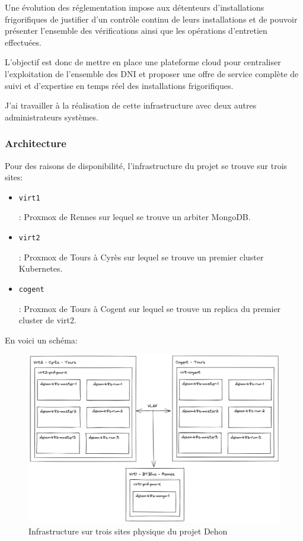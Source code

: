 \documentclass[12pt]{article}
\begin{document}
Une évolution des réglementation impose aux détenteurs d'installations frigorifiques de justifier d'un contrôle continu de leurs installations et de pouvoir présenter l'ensemble des vérifications ainsi que les opérations d'entretien effectuées.

L'objectif est donc de mettre en place une plateforme cloud pour centraliser l'exploitation de l'ensemble des DNI et proposer une offre de service complète de suivi et d'expertise en temps réel des installations frigorifiques.

J'ai travailler à la réalisation de cette infrastructure avec deux autres administrateurs systèmes.

\subsubsection{Architecture}
Pour des raisons de disponibilité, l'infrastructure du projet se trouve sur trois sites:
\begin{itemize}
    \item \begin{code}\texttt{virt1}\end{code}: \gls{Proxmox} de Rennes sur lequel se trouve un arbiter MongoDB. 
    \item \begin{code}\texttt{virt2}\end{code}: \gls{Proxmox} de Tours à Cyrès sur lequel se trouve un premier \gls{cluster} \gls{Kubernetes}.
    \item \begin{code}\texttt{cogent}\end{code}: \gls{Proxmox} de Tours à Cogent sur lequel se trouve un replica du premier \gls{cluster} de virt2.
\end{itemize}

\newpage
En voici un schéma:
\begin{figure}[!ht]
    \centering
        \includegraphics[width=\textwidth]{src/graph_dehon1.png}
    \caption{Infrastructure sur trois sites physique du projet Dehon}
    \label{fig:graph_dehon1}
\end{figure}
\end{document}
